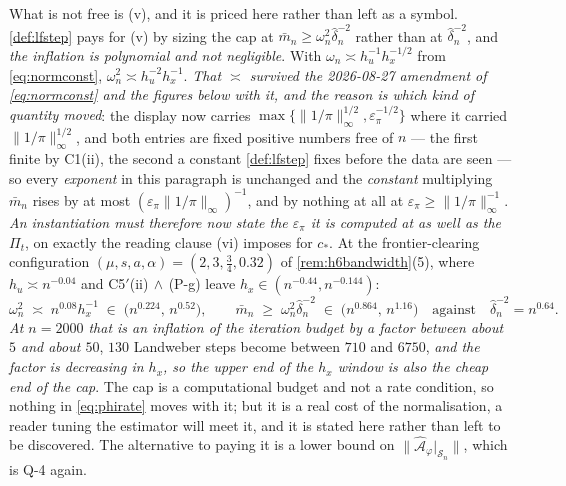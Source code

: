 \begin{lemma}
What is not free is (v), and it is priced here rather than left as a symbol.
\cref{def:lfstep} pays for (v) by sizing the cap at $\bar m_n\ge\omega_n^{2}\hat\delta_n^{-2}$
rather than at $\hat\delta_n^{-2}$, and \emph{the inflation is polynomial and not negligible}. With
$\omega_n\asymp h_u^{-1}h_x^{-1/2}$ from \eqref{eq:normconst}, $\omega_n^{2}\asymp h_u^{-2}h_x^{-1}$.
\emph{That $\asymp$ survived the 2026-08-27 amendment of \eqref{eq:normconst} and the figures below with
it, and the reason is which kind of quantity moved}: the display now carries
$\max\{\|1/\pi\|_\infty^{1/2},\varepsilon_\pi^{-1/2}\}$ where it carried $\|1/\pi\|_\infty^{1/2}$, and
both entries are fixed positive numbers free of $n$ --- the first finite by C1(ii), the second a
constant \cref{def:lfstep} fixes before the data are seen --- so every \emph{exponent} in this
paragraph is unchanged and the \emph{constant} multiplying $\bar m_n$ rises by at most
$(\varepsilon_\pi\|1/\pi\|_\infty)^{-1}$, and by nothing at all at $\varepsilon_\pi\ge\|1/\pi\|_\infty^{-1}$.
\emph{An instantiation must therefore now state the $\varepsilon_\pi$ it is computed at as well as the
$\Pi_t$}, on exactly the reading clause \textup{(vi)} imposes for $c_\ast$.
At the frontier-clearing configuration $(\mu,s,a,\alpha)=(2,3,\tfrac34,0.32)$ of
\cref{rem:h6bandwidth}(5), where $h_u\asymp n^{-0.04}$ and C5$'$(ii)$\,\wedge\,$(P-g) leave
$h_x\in(n^{-0.44},n^{-0.144})$:
\[
\omega_n^{2}\;\asymp\;n^{0.08}h_x^{-1}\;\in\;\big(n^{0.224},\,n^{0.52}\big),
\qquad
\bar m_n\;\ge\;\omega_n^{2}\hat\delta_n^{-2}\;\in\;\big(n^{0.864},\,n^{1.16}\big)
\quad\text{against}\quad
\hat\delta_n^{-2}=n^{0.64} .
\]
\emph{At $n=2000$ that is an inflation of the iteration budget by a factor between about $5$ and about
$50$}, $130$ Landweber steps become between $710$ and $6750$, \emph{and the factor is decreasing in
$h_x$, so the upper end of the $h_x$ window is also the cheap end of the cap}. The cap is a computational
budget and not a rate condition, so nothing in \eqref{eq:phirate} moves with it; but it is a real cost of
the normalisation, a reader tuning the estimator will meet it, and it is stated here rather than left to
be discovered. The alternative to paying it is a lower bound on
$\|\hat{\mathcal A}_\varphi\vert_{\mathcal S_n}\|$, which is Q-4 again.
\end{lemma}

